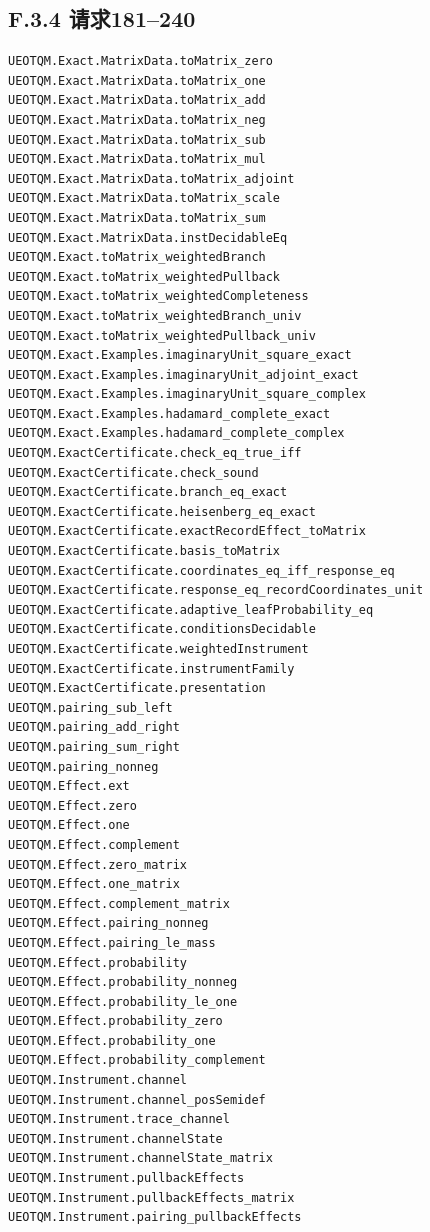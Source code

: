 \documentclass[
  11pt,
  oneside]{book}
\begin{document}
\hypertarget{f.3.4-ux8bf7ux6c42181240}{%
\subsection{F.3.4 请求181--240}\label{f.3.4-ux8bf7ux6c42181240}}

\begin{Verbatim}[breaklines,breakanywhere,fontsize=\scriptsize]
UEOTQM.Exact.MatrixData.toMatrix_zero
UEOTQM.Exact.MatrixData.toMatrix_one
UEOTQM.Exact.MatrixData.toMatrix_add
UEOTQM.Exact.MatrixData.toMatrix_neg
UEOTQM.Exact.MatrixData.toMatrix_sub
UEOTQM.Exact.MatrixData.toMatrix_mul
UEOTQM.Exact.MatrixData.toMatrix_adjoint
UEOTQM.Exact.MatrixData.toMatrix_scale
UEOTQM.Exact.MatrixData.toMatrix_sum
UEOTQM.Exact.MatrixData.instDecidableEq
UEOTQM.Exact.toMatrix_weightedBranch
UEOTQM.Exact.toMatrix_weightedPullback
UEOTQM.Exact.toMatrix_weightedCompleteness
UEOTQM.Exact.toMatrix_weightedBranch_univ
UEOTQM.Exact.toMatrix_weightedPullback_univ
UEOTQM.Exact.Examples.imaginaryUnit_square_exact
UEOTQM.Exact.Examples.imaginaryUnit_adjoint_exact
UEOTQM.Exact.Examples.imaginaryUnit_square_complex
UEOTQM.Exact.Examples.hadamard_complete_exact
UEOTQM.Exact.Examples.hadamard_complete_complex
UEOTQM.ExactCertificate.check_eq_true_iff
UEOTQM.ExactCertificate.check_sound
UEOTQM.ExactCertificate.branch_eq_exact
UEOTQM.ExactCertificate.heisenberg_eq_exact
UEOTQM.ExactCertificate.exactRecordEffect_toMatrix
UEOTQM.ExactCertificate.basis_toMatrix
UEOTQM.ExactCertificate.coordinates_eq_iff_response_eq
UEOTQM.ExactCertificate.response_eq_recordCoordinates_unit
UEOTQM.ExactCertificate.adaptive_leafProbability_eq
UEOTQM.ExactCertificate.conditionsDecidable
UEOTQM.ExactCertificate.weightedInstrument
UEOTQM.ExactCertificate.instrumentFamily
UEOTQM.ExactCertificate.presentation
UEOTQM.pairing_sub_left
UEOTQM.pairing_add_right
UEOTQM.pairing_sum_right
UEOTQM.pairing_nonneg
UEOTQM.Effect.ext
UEOTQM.Effect.zero
UEOTQM.Effect.one
UEOTQM.Effect.complement
UEOTQM.Effect.zero_matrix
UEOTQM.Effect.one_matrix
UEOTQM.Effect.complement_matrix
UEOTQM.Effect.pairing_nonneg
UEOTQM.Effect.pairing_le_mass
UEOTQM.Effect.probability
UEOTQM.Effect.probability_nonneg
UEOTQM.Effect.probability_le_one
UEOTQM.Effect.probability_zero
UEOTQM.Effect.probability_one
UEOTQM.Effect.probability_complement
UEOTQM.Instrument.channel
UEOTQM.Instrument.channel_posSemidef
UEOTQM.Instrument.trace_channel
UEOTQM.Instrument.channelState
UEOTQM.Instrument.channelState_matrix
UEOTQM.Instrument.pullbackEffects
UEOTQM.Instrument.pullbackEffects_matrix
UEOTQM.Instrument.pairing_pullbackEffects
\end{Verbatim}
\end{document}
